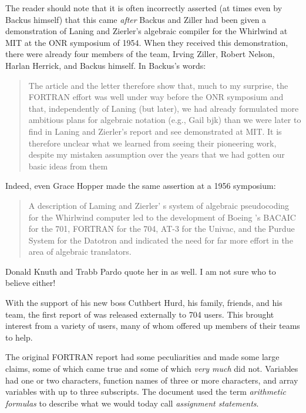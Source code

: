 The reader should note that it is often incorrectly asserted (at times even by
Backus himself\cite{Backus_1980_Programming_in_America_in_1950s}) that this
came \textit{after} Backus and Ziller had been given a demonstration of Laning
and Zierler's algebraic compiler for the Whirlwind at MIT at the ONR symposium
of 1954. When they received this demonstration, there were already four members
of the \FTN{} team, Irving Ziller, Robert Nelson, Harlan Herrick, and Backus
himself. In Backus's words\cite{Backus_1980_Programming_in_America_in_1950s}:

\begin{quotation}
	The article and the letter therefore show that, much to my surprise, the
	FORTRAN effort was well under way before the ONR symposium and that,
	independently of Laning (but later), we had already formulated more ambitious
	plans for algebraic notation (e.g., Gail bjk) than we were later to find in
	Laning and Zierler's report and see demonstrated at MIT. It is therefore
	unclear what we learned from seeing their pioneering work, despite my mistaken
	assumption over the years that we had gotten our basic ideas from them
\end{quotation}

Indeed, even Grace Hopper made the same assertion at a 1956 symposium:

\begin{quotation}
	A description of Laming and Zierler' s system of algebraic pseudocoding for
	the Whirlwind computer led to the development of Boeing 's BACAIC for the 701,
	FORTRAN for the 704, AT-3 for the Univac, and the Purdue System for the Datotron and
	indicated the need for far more effort in the area of algebraic
	translators.
	\cite{Knuth_TrabbPardo_1976_Early_Development}
\end{quotation}

Donald Knuth and Trabb Pardo quote her in 
as well.
I am not sure who to believe either!

With the support of his new boss Cuthbert Hurd, his family, friends, and his
team, the first report of \FTN{} was released externally to 704 users. This
brought interest from a variety of users, many of whom offered up members of
their teams to help.

The original FORTRAN report had some peculiarities and made some large claims,
some of which came true and some of which \textit{very much} did not.
Variables had one or two characters, function names of three or more characters,
and array variables with up to three subscripts.
The document used the term \textit{arithmetic formulas} to describe what
we would today call \textit{assignment statements}.

